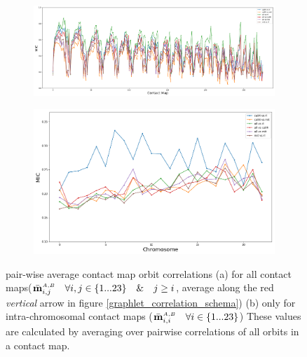 \documentclass[a4,center,fleqn]{NAR}
\begin{document}
\begin{figure}[t]
    \centering
    \begin{subfigure}[b]{\textwidth}
        \includegraphics[width=\textwidth]{figures/contact_maps_correlations_all.png}
        \caption{}
        \label{fig:contact_maps_correlations_all}
    \end{subfigure}
    \begin{subfigure}[b]{\textwidth}
        \includegraphics[width=\textwidth]{figures/contact_maps_correlations_intra.png}
        \caption{}
        \label{fig:contact_maps_correlations_intra}
    \end{subfigure}
    \caption{pair-wise average contact map orbit correlations
             (a) for all contact maps($\bar{\mathbf{m}}^{\scriptscriptstyle \scriptscriptstyle A,B}_{i,j} 
            \quad \forall i,j \in \{1 ... 23\} \quad \& \quad j \ge i$,
            average along the red \textit{vertical} arrow in figure 
            \ref{graphlet_correlation_schema})
             (b) only for intra-chromosomal contact maps
            ($\bar{\mathbf{m}}^{\scriptscriptstyle \scriptscriptstyle A,B}_{i,i} 
            \quad \forall i \in \{1 ... 23\} $)
             These values are calculated by averaging over 
             pairwise correlations of all orbits in a 
             contact map.
             }
    \label{fig:contact_maps_correlations}
\end{figure}
\end{document}
